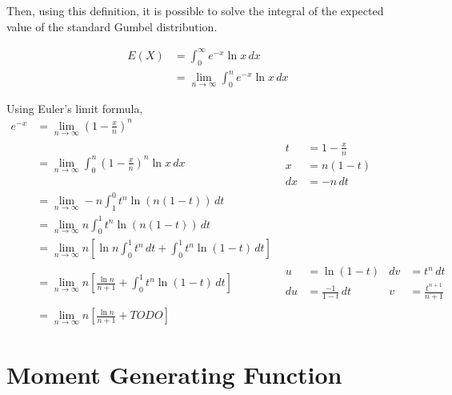 \documentclass[titlepage,12 pt]{article}
\begin{document}
Then, using this definition, it is possible to solve the integral of the expected value of the standard Gumbel distribution.

\begin{align*}
E(X) &= \int_{0}^{\infty} e^{-x} \ln{x} \, dx \\[3mm]
     &= \lim_{n\to \infty} \int_{0}^{n} e^{-x} \ln{x} \, dx 
\end{align*}

Using Euler's limit formula,
\begin{align*}
e^{-x}&= \lim_{n\to \infty} \left(1 - \frac{x}{n}\right)^{n} \\
      &= \lim_{n\to \infty} \int_{0}^{n} \left(1 - \frac{x}{n}\right)^{n} \ln{x} \, dx 
      & \boxed{\begin{aligned}t &= 1 - \frac{x}{n}\\
             x &= n (1-t) \\
             dx &= -n \, dt \end{aligned}} \\
      &= \lim_{n\to \infty} -n \int_{1}^{0} t^{n} \ln \left(n(1-t)\right)\, dt \\[3mm]
      &= \lim_{n\to \infty} n \int_{0}^{1} t^{n} \ln \left(n(1-t)\right)\, dt \\[3mm]
      &= \lim_{n\to \infty} n \left[ \ln{n} \int_{0}^{1} t^n \, dt + \int_{0}^{1} t^n \ln (1-t) \, dt\right] \\[3mm]
      &= \lim_{n\to \infty} n \left[ \frac{\ln{n}}{n+1} + \int_{0}^{1} t^n \ln (1-t) \, dt\right] 
      & \boxed{\begin{aligned}u &= \ln (1-t) &
             dv &= t^n \, dt \\
             du &= \frac{-1}{1-t} \, dt &
             v &= \frac{t^{n+1}}{n+1} \end{aligned}} \\[3 mm]
      &= \lim_{n\to \infty} n \left[ \frac{\ln{n}}{n+1} +  TO DO \right] 
\end{align*}


\section{Moment Generating Function}
\end{document}
